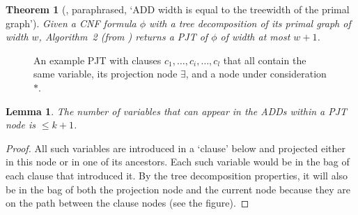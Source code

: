 \documentclass{article}
\newtheorem{theorem}{Theorem}
\newtheorem{lemma}{Lemma}
\theoremstyle{definition}
\theoremstyle{remark}
\begin{document}
\begin{theorem}[\cite{DBLP:conf/cp/DudekPV20}, paraphrased, `ADD width is equal
  to the treewidth of the primal graph']
  Given a CNF formula $\phi$ with a tree decomposition of its primal graph of
  width $w$, Algorithm~2 (from \cite{DBLP:conf/cp/DudekPV20}) returns a
  PJT of $\phi$ of width at most $w+1$.
\end{theorem}

\begin{figure}
  \centering
  \caption{An example PJT with clauses $c_1, \dots, c_i, \dots, c_l$ that all
    contain the same variable, its projection node $\exists$, and a node under
    consideration $\ast$.}
\end{figure}

\begin{lemma}
  The number of variables that can appear in the ADDs within a PJT node is $\le
  k+1$.
\end{lemma}
\begin{proof}
  All such variables are introduced in a `clause' below and projected either in
  this node or in one of its ancestors. Each such variable would be in the bag
  of each clause that introduced it. By the tree decomposition properties, it
  will also be in the bag of both the projection node and the current node
  because they are on the path between the clause nodes (see the figure).
\end{proof}
\end{document}

